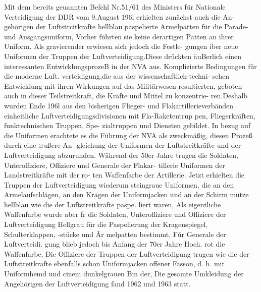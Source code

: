 

Mit dem bercits geuannten Befchl Nr.51/61 des
Ministers für Nationale Verteidigung der DDR
vom 9.August 196l erhielten zunächst auch die An-
gehörigen der Luftstrcitkrafte hellblau paspelierte
Armelpatten für die Parade- und Ausgangsuniform,
Vorher führten sie keine derartigen Patten an ihrer
Uniform.
Als gravierender erwiesen sich jedoch die Festle-
gungen iber neue Uniformen der Truppen der
Luftverteidigung.Diese drückten äuBerlich einen
interessanten EntwicklungsprozeB in der NVA aus.
Komplizierte Bedingungen fǔr die moderne Luft.
verteidigung,die aus der wissenschaftlich-techni-
schen Entwicklung mit ihren Wirkungen auf das
Militärwesen resultierten, geboten auch in dieser
Teilstreitkraft, die Kräfte und Mittel zu konzentrie-
ren.Deshalb wurden Ende 196l aus den bisherigen
Flieger- und Flakartillerieverbänden einheitliche
Luftverteidigungsdivisionen mit Fla-Raketentrup
pen, Fliegerkräften, funktechnischen Truppen, Spe-
zialtruppen und Diensten gebildet. In bezug auf die
Uniformen erachtete es die Führung der NVA als
zweckmäßig, diesen Prozeß durch eine ¤ußere An-
gleichung der Uniformen der Luftstreitkräfte und
der Luftverteidigung abzurunden.
Während der 50er Jahre trugen die Soldaten,
Unteroffiziere, Offiziere und Generale der Flakar-
tillerie Uniformen der Landstreitkräfte mit der ro-
ten Waffenfarbe der Artillerie. Jetzt erhielten die Truppen der Luftverteidigung wiederum steingraue
Uniformen, die an den Armelaufschlägen, an den
Kragen der Uniformjacken und an der Schirm
mütze hellblau wie die der Luftstreitkräfte paspe.
liert waren, Als eigentliche Waffenfarbe wurde aber
fr die Soldaten, Unteroffiziere und Offiziere der
Luftverteidigung Hellgrau für die Paspelierung der
Kragenspiegel, Schulterklappen, -stücke und Ãr
melpatten bestimmt, Fǔr Generale der Luftverteidi.
gung blieb jedoch bis Anfang der 70er Jahre Hoch.
rot die Waffenfarbe, Die Offiziere der Truppen der
Luftverteidigung trugen wie die der Luftstreitkrafte
ebenfalls schon Uniformjacken offener Fasson, d. h.
mit Uniformhemd und cinem dunkelgrauen Bin
der, Die gesamte Umkleidung der Angehörigen der
Luftverteidigung fand 1962 und 1963 statt.

